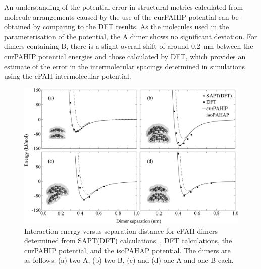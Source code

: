 An understanding of the potential error in structural metrics calculated from molecule arrangements caused by the use of the curPAHIP potential can be obtained by comparing to the DFT results. As the molecules used in the parameterisation of the potential, the A dimer shows no significant deviation.  For dimers containing B, there is a slight overall shift of around 0.2~nm between the curPAHIP potential energies and those calculated by DFT, which provides an estimate of the error in the intermolecular spacings determined in simulations using the cPAH intermolecular potential.  
%
\begin{figure}[!tbh]
\centering
\includegraphics[width=1\linewidth]{Figures/potentialDFT_curves.eps}
\caption{Interaction energy versus separation distance for cPAH dimers determined from SAPT(DFT) calculations~\cite{Cabaleiro-Lago2018}, DFT calculations, the curPAHIP potential, and the isoPAHAP potential. The dimers are as follows: (a) two A, (b) two B, (c) and (d) one A and one B each.}
\label{fig:potentialDFTcurves}
\end{figure}
%

